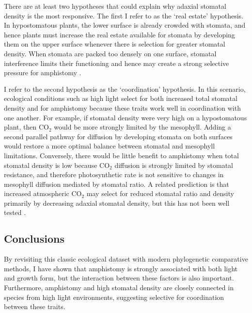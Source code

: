 \documentclass[12pt, oneside]{article}
\begin{document}
There are at least two hypotheses that could explain why adaxial stomatal density is the most responsive. The first I refer to as the `real estate' hypothesis. In hypostomatous plants, the lower surface is already crowded with stomata, and hence plants must increase the real estate available for stomata by developing them on the upper surface whenever there is selection for greater stomatal density. When stomata are packed too densely on one surface, stomatal interference limits their functioning and hence may create a strong selective pressure for amphistomy \citep{Parlange_Waggoner_1970, Dow_etal_2014a}. 

I refer to the second hypothesis as the `coordination' hypothesis. In this scenario, ecological conditions such as high light select for both increased total stomatal density and for amphistomy because these traits work well in coordination with one another. For example, if stomatal density were very high on a hypostomatous plant, then CO$_2$ would be more strongly limited by the mesophyll. Adding a second parallel pathway for diffusion by developing stomata on both surfaces would restore a more optimal balance between stomatal and mesophyll limitations. Conversely, there would be little benefit to amphistomy when total stomatal density is low because CO$_2$ diffusion is strongly limited by stomatal resistance, and therefore photosynthetic rate is not sensitive to changes in mesophyll diffusion mediated by stomatal ratio. A related prediction is that increased atmospheric CO$_2$ may select for reduced stomatal ratio and density primarily by decreasing adaxial stomatal density, but this has not been well tested \citep[but see][]{Woodward_Bazzaz_1988}.

\subsection*{Conclusions}

By revisiting this classic ecological dataset with modern phylogenetic comparative methods, I have shown that amphistomy is strongly associated with both light and growth form, but the interaction between these factors is also important. Furthermore, amphistomy and high stomatal density are closely connected in species from high light environments, suggesting selective for coordination between these traits.

\end{document}
